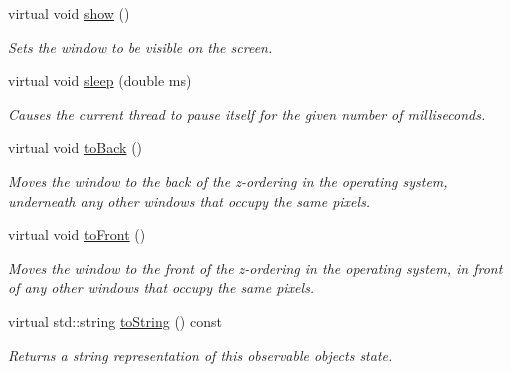 \begin{DoxyCompactItemize}
virtual void \mbox{\hyperlink{classsgl_1_1GWindow_a4b148f40a95444d5669406b918ad2f52}{show}} ()
\begin{DoxyCompactList}\small\item\em Sets the window to be visible on the screen. \end{DoxyCompactList}\item 
virtual void \mbox{\hyperlink{classsgl_1_1GWindow_aa3381590c1ef33c08000c2fbb2bf0dd0}{sleep}} (double ms)
\begin{DoxyCompactList}\small\item\em Causes the current thread to pause itself for the given number of milliseconds. \end{DoxyCompactList}\item 
virtual void \mbox{\hyperlink{classsgl_1_1GWindow_a6053c984b166df7d3db5ee4c4ad65b99}{to\+Back}} ()
\begin{DoxyCompactList}\small\item\em Moves the window to the back of the z-\/ordering in the operating system, underneath any other windows that occupy the same pixels. \end{DoxyCompactList}\item 
virtual void \mbox{\hyperlink{classsgl_1_1GWindow_a48a9c646659814220ac869bbcb60b52c}{to\+Front}} ()
\begin{DoxyCompactList}\small\item\em Moves the window to the front of the z-\/ordering in the operating system, in front of any other windows that occupy the same pixels. \end{DoxyCompactList}\item 
virtual std\+::string \mbox{\hyperlink{classsgl_1_1GObservable_a1fe5121d6528fdea3f243321b3fa3a49}{to\+String}} () const
\begin{DoxyCompactList}\small\item\em Returns a string representation of this observable object\textquotesingle{}s state. \end{DoxyCompactList}\end{DoxyCompactItemize}
